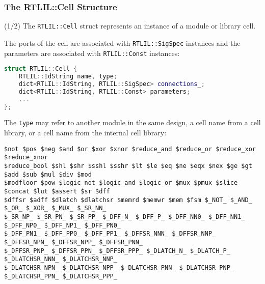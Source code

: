 \subsubsection{The RTLIL::Cell Structure}

\begin{frame}[t, fragile]{\subsubsecname (1/2)}
The {\tt RTLIL::Cell} struct represents an instance of a module or library cell.

\smallskip
The ports of the cell
are associated with {\tt RTLIL::SigSpec} instances and the parameters are associated with {\tt RTLIL::Const}
instances:

\bigskip
\begin{lstlisting}[xleftmargin=1cm, basicstyle=\ttfamily\fontsize{8pt}{10pt}\selectfont, language=C++]
struct RTLIL::Cell {
    RTLIL::IdString name, type;
    dict<RTLIL::IdString, RTLIL::SigSpec> connections_;
    dict<RTLIL::IdString, RTLIL::Const> parameters;
    ...
};
\end{lstlisting}

\bigskip
The {\tt type} may refer to another module in the same design, a cell name from a cell library, or a
cell name from the internal cell library:

\begin{lstlisting}[xleftmargin=1cm, basicstyle=\ttfamily\fontsize{6pt}{7pt}\selectfont]
$not $pos $neg $and $or $xor $xnor $reduce_and $reduce_or $reduce_xor $reduce_xnor
$reduce_bool $shl $shr $sshl $sshr $lt $le $eq $ne $eqx $nex $ge $gt $add $sub $mul $div $mod
$modfloor $pow $logic_not $logic_and $logic_or $mux $pmux $slice $concat $lut $assert $sr $dff
$dffsr $adff $dlatch $dlatchsr $memrd $memwr $mem $fsm $_NOT_ $_AND_ $_OR_ $_XOR_ $_MUX_ $_SR_NN_
$_SR_NP_ $_SR_PN_ $_SR_PP_ $_DFF_N_ $_DFF_P_ $_DFF_NN0_ $_DFF_NN1_ $_DFF_NP0_ $_DFF_NP1_ $_DFF_PN0_
$_DFF_PN1_ $_DFF_PP0_ $_DFF_PP1_ $_DFFSR_NNN_ $_DFFSR_NNP_ $_DFFSR_NPN_ $_DFFSR_NPP_ $_DFFSR_PNN_
$_DFFSR_PNP_ $_DFFSR_PPN_ $_DFFSR_PPP_ $_DLATCH_N_ $_DLATCH_P_ $_DLATCHSR_NNN_ $_DLATCHSR_NNP_
$_DLATCHSR_NPN_ $_DLATCHSR_NPP_ $_DLATCHSR_PNN_ $_DLATCHSR_PNP_ $_DLATCHSR_PPN_ $_DLATCHSR_PPP_
\end{lstlisting}
\end{frame}

